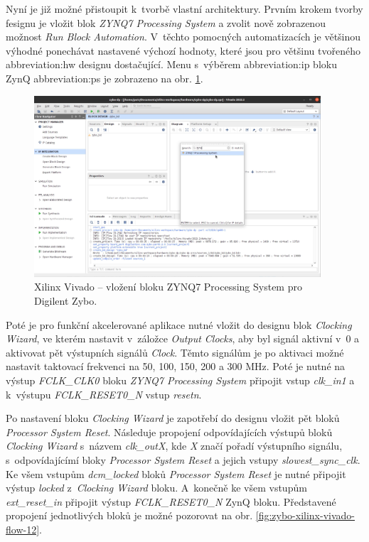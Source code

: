 \documentclass[a4paper, twoside, 11pt]{article}
\newcommand{\fbar}{\FloatBarrier}
\begin{document}
\begin{appendices}
		Nyní je již možné přistoupit k~tvorbě vlastní architektury. Prvním krokem tvorby fesignu je vložit blok \textit{ZYNQ7 Processing System} a zvolit nově zobrazenou možnost \textit{Run Block Automation}. V~těchto pomocných automatizacích je většinou výhodné ponechávat nastavené výchozí hodnoty, které jsou pro většinu tvořeného \gls{abbreviation:hw} designu dostačující. Menu s~výběrem \gls{abbreviation:ip} bloku ZynQ \gls{abbreviation:ps} je zobrazeno na obr. \ref{fig:zybo-xilinx-vivado-flow-07}.

		\begin{figure}[htbp!]
			\centering
			\includegraphics[width=0.95\textwidth]{src/png/zybo-xilinx-vivado-flow/zybo-xilinx-vivado-flow-07.jpg}
			\caption{Xilinx Vivado – vložení bloku ZYNQ7 Processing System pro Digilent Zybo.}
			\label{fig:zybo-xilinx-vivado-flow-07}
		\end{figure}

		\fbar
		Poté je pro funkční akcelerované aplikace nutné vložit do designu blok \textit{Clocking Wizard}, ve kterém nastavit v~záložce \textit{Output Clocks}, aby byl signál aktivní v~0 a aktivovat pět výstupních signálů \textit{Clock}. Těmto signálům je po aktivaci možné nastavit taktovací frekvenci na 50, 100, 150, 200 a 300 MHz. Poté je nutné na výstup \textit{FCLK\_CLK0} bloku \textit{ZYNQ7 Processing System} připojit vstup \textit{clk\_in1} a k~výstupu \textit{FCLK\_RESET0\_N} vstup \textit{resetn}.\par
		Po nastavení bloku \textit{Clocking Wizard} je zapotřebí do designu vložit pět bloků \textit{Processor System Reset}. Následuje propojení odpovídajících výstupů bloků \textit{Clocking Wizard} s~názvem \textit{clk\_outX}, kde \textit{X} značí pořadí výstupního signálu, s~odpovídajícímí bloky \textit{Processor System Reset} a jejich vstupy \textit{slowest\_sync\_clk}. Ke všem vstupům \textit{dcm\_locked} bloků \textit{Processor System Reset} je nutné připojit výstup \textit{locked} z~\textit{Clocking Wizard} bloku. A~konečně ke všem vstupům \textit{ext\_reset\_in} připojit výstup \textit{FCLK\_RESET0\_N} ZynQ bloku. Představené propojení jednotlivých bloků je možné pozorovat na obr. \ref{fig:zybo-xilinx-vivado-flow-12}.


\end{appendices}
\end{document}
